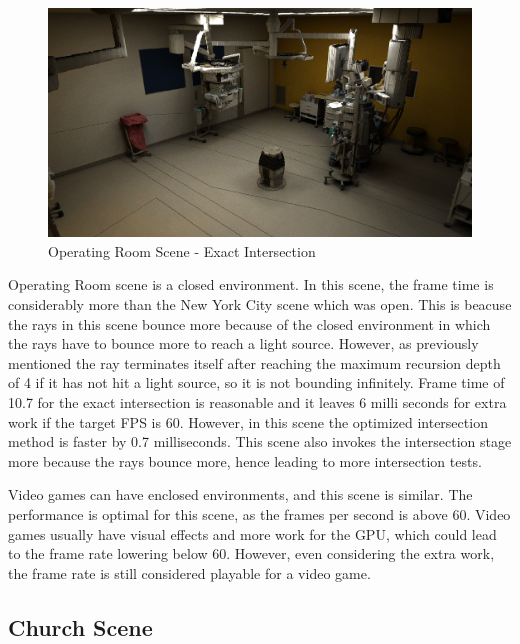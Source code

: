 \documentclass[12pt]{article}
\begin{document}
\begin{figure}[H]
    \begin{center}
        \includegraphics[scale=0.25]{OperationRoom}
    \end{center}
    \caption{Operating Room Scene - Exact Intersection}
    \label{fig:OperationRoom}
\end{figure}

Operating Room scene is a closed environment. In this scene, the frame time is considerably more than the New York City scene
which was open. This is beacuse the rays in this scene bounce more because of the closed environment
in which the rays have to bounce more to reach a light source. However, as previously mentioned 
the ray terminates itself after reaching the maximum recursion depth of 4 if it has not
hit a light source, so it is not bounding infinitely. Frame time of 10.7 for the exact intersection is reasonable and it 
leaves 6 milli seconds for extra work if the target FPS is 60. However, in this scene the optimized
intersection method is faster by 0.7 milliseconds. This scene also invokes the intersection stage
more because the rays bounce more, hence leading to more intersection tests.

Video games can have enclosed environments, and this scene is similar. The performance is optimal for this scene,
as the frames per second is above 60. Video games usually have visual effects and more work for the GPU,
which could lead to the frame rate lowering below 60. However, even considering the extra work,
the frame rate is still considered playable for a video game.

\subsection{Church Scene}
\end{document}
